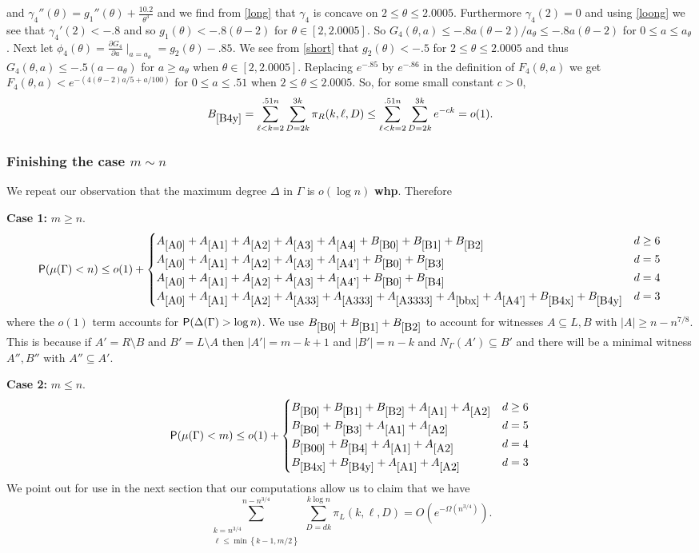 \documentclass[11pt]{article}
\def\D{\Delta}
\def\f{\phi}
\def\g{\gamma}
\def\G{\Gamma}
\def\th{\theta}
\def\m{\mu}
\def\p{\pi}
\def\whp{{\bf whp}}
\newcommand{\set}[1]{\left\{#1\right\}}
\def\Pr{{\sf P}}
\newcommand{\beq}[1]{\begin{equation}\label{#1}}
\newcommand{\eeq}{\end{equation}}
\def\c{{3/4}}
\begin{document}
and $\g_4''(\th)=g_1''(\th)+\frac{10.2}{\th^3}$ and we find from
\eqref{long} that $\g_4$ is concave on $2\leq \th\leq 2.0005$. Furthermore $\g_4(2)=0$ and 
using \eqref{loong} we see that $\g_4'(2)<-.8$ and so $g_1(\th)<-.8(\th-2)$ for $\th\in [2,2.0005]$.
So $G_4(\th,a)\leq -.8a(\th-2)/a_\th\leq -.8a(\th-2)$ for $0\leq a\leq a_\th$.
Next let $\f_4(\th)=\frac{\partial G_4}{\partial a}
\mid_{a=a_\th}=g_2(\th)-.85$. We see from \eqref{short} that $g_2(\th)<-.5$ for $2\leq \th\leq 2.0005$ and thus 
$G_4(\th,a)\leq -.5(a-a_\th)$ for $a\geq a_\th$ when $\th\in [2,2.0005]$. 
Replacing $e^{-.85}$ by $e^{-.86}$ in the definition of $F_4(\th,a)$ we get $F_4(\th,a)<e^{-(4(\th-2)a/5+a/100)}$
for $0\leq a\leq .51$ when
$2\leq \th\leq 2.0005$.
So, for some small constant $c>0$,
\beq{B4y}
B_{\ref{B4y}}=\sum_{\ell<k=2}^{.51n}\sum_{D=2k}^{3k}\p_R(k,\ell,D)\leq
\sum_{\ell<k=2}^{.51n}\sum_{D=2k}^{3k}e^{-ck}=o(1).
\eeq
\subsubsection{Finishing the case $m\sim n$}\label{combine}
We repeat our observation that the maximum degree $\D$ in $\G$ is $o(\log n)$ \whp. Therefore

{\bf Case 1:} $m\geq n$.
$$\Pr(\m(\G)<n)\leq o(1)+\begin{cases}
 A_{\ref{A0}}+A_{\ref{A1}}+A_{\ref{A2}}+A_{\ref{A3}}+A_{\ref{A4}}+B_{\ref{B0}}+B_{\ref{B1}}+B_{\ref{B2}}
                          &d\geq 6\\
A_{\ref{A0}}+A_{\ref{A1}}+A_{\ref{A2}}+A_{\ref{A3}}+A_{\ref{A4'}}+B_{\ref{B0}}+B_{\ref{B3}}&d=5\\
A_{\ref{A0}}+A_{\ref{A1}}+A_{\ref{A2}}+A_{\ref{A3}}+A_{\ref{A4'}}+B_{\ref{B0}}+B_{\ref{B4}}&d=4\\
A_{\ref{A0}}+A_{\ref{A1}}+A_{\ref{A2}}+A_{\ref{A33}}+A_{\ref{A333}}+A_{\ref{A3333}}+A_{\ref{bbx}}+A_{\ref{A4'}}+B_{\ref{B4x}}+B_{\ref{B4y}}&d=3
                         \end{cases}
$$
where the $o(1)$ term accounts for $\Pr(\D(\G)>\log n)$.
We use $B_{\ref{B0}}+B_{\ref{B1}}+B_{\ref{B2}}$ to account for witnesses $A\subseteq L,B$ with $|A|\geq n-n^{7/8}$. 
This is because if $A'=R\setminus B$ and $B'=L\setminus A$ then $|A'|=m-k+1$ and $|B'|=n-k$ and $N_\G(A')\subseteq B'$
and there will be a minimal witness $A'',B''$ with $A''\subseteq A'$.

{\bf Case 2:} $m\leq n$.
$$\Pr(\m(\G)<m)\leq o(1)+\begin{cases}
B_{\ref{B0}}+B_{\ref{B1}}+B_{\ref{B2}}+A_{\ref{A1}}+A_{\ref{A2}}&d\geq 6\\
B_{\ref{B0}}+B_{\ref{B3}}+A_{\ref{A1}}+A_{\ref{A2}}&d=5\\
B_{\ref{B00}}+B_{\ref{B4}}+A_{\ref{A1}}+A_{\ref{A2}}&d=4\\
B_{\ref{B4x}}+B_{\ref{B4y}}+A_{\ref{A1}}+A_{\ref{A2}}&d=3
                         \end{cases}
$$
We point out for use in the next section that our computations allow us 
to claim that we have
\beq{next}
\sum_{\substack{k=n^\c\\ \ell\leq\min\set{k-1,m/2}}}^{n-n^\c}\sum_{D=dk}^{k\log n}\p_L(k,\ell,D)=O(e^{-\Omega(n^\c)}).
\eeq
\end{document}
